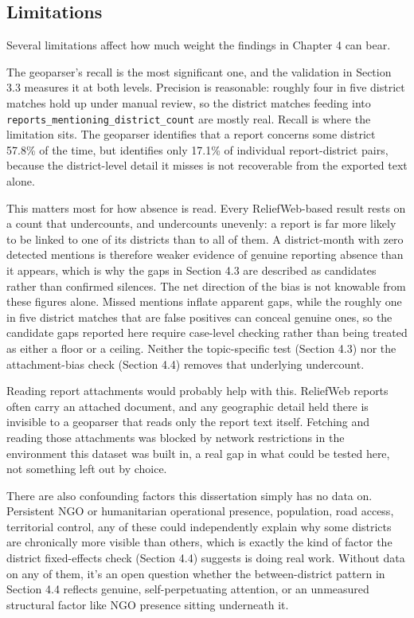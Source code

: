 \documentclass[12pt,a4paper]{article}
\begin{document}
\subsection{Limitations}

Several limitations affect how much weight the findings in Chapter 4 can bear.

The geoparser's recall is the most significant one, and the validation in Section 3.3 measures it at both levels. Precision is reasonable: roughly four in five district matches hold up under manual review, so the district matches feeding into \texttt{reports\_mentioning\_district\_count} are mostly real. Recall is where the limitation sits. The geoparser identifies that a report concerns some district 57.8\% of the time, but identifies only 17.1\% of individual report-district pairs, because the district-level detail it misses is not recoverable from the exported text alone.

This matters most for how absence is read. Every ReliefWeb-based result rests on a count that undercounts, and undercounts unevenly: a report is far more likely to be linked to one of its districts than to all of them. A district-month with zero detected mentions is therefore weaker evidence of genuine reporting absence than it appears, which is why the gaps in Section 4.3 are described as candidates rather than confirmed silences. The net direction of the bias is not knowable from these figures alone. Missed mentions inflate apparent gaps, while the roughly one in five district matches that are false positives can conceal genuine ones, so the candidate gaps reported here require case-level checking rather than being treated as either a floor or a ceiling. Neither the topic-specific test (Section 4.3) nor the attachment-bias check (Section 4.4) removes that underlying undercount.

Reading report attachments would probably help with this. ReliefWeb reports often carry an attached document, and any geographic detail held there is invisible to a geoparser that reads only the report text itself. Fetching and reading those attachments was blocked by network restrictions in the environment this dataset was built in, a real gap in what could be tested here, not something left out by choice.

There are also confounding factors this dissertation simply has no data on. Persistent NGO or humanitarian operational presence, population, road access, territorial control, any of these could independently explain why some districts are chronically more visible than others, which is exactly the kind of factor the district fixed-effects check (Section 4.4) suggests is doing real work. Without data on any of them, it's an open question whether the between-district pattern in Section 4.4 reflects genuine, self-perpetuating attention, or an unmeasured structural factor like NGO presence sitting underneath it.
\end{document}
